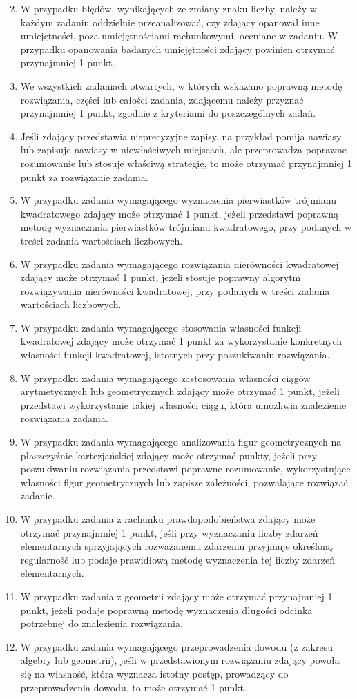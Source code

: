 \documentclass[10pt]{article}
\begin{document}
\begin{enumerate}
  \setcounter{enumi}{1}
  \item W przypadku błędów, wynikających ze zmiany znaku liczby, należy w każdym zadaniu oddzielnie przeanalizować, czy zdający opanował inne umiejętności, poza umiejętnościami rachunkowymi, oceniane w zadaniu. W przypadku opanowania badanych umiejętności zdający powinien otrzymać przynajmniej 1 punkt.
  \item We wszystkich zadaniach otwartych, w których wskazano poprawną metodę rozwiązania, części lub całości zadania, zdającemu należy przyznać przynajmniej 1 punkt, zgodnie z kryteriami do poszczególnych zadań.
  \item Jeśli zdający przedstawia nieprecyzyjne zapisy, na przykład pomija nawiasy lub zapisuje nawiasy w niewłaściwych miejscach, ale przeprowadza poprawne rozumowanie lub stosuje właściwą strategię, to może otrzymać przynajmniej 1 punkt za rozwiązanie zadania.
  \item W przypadku zadania wymagającego wyznaczenia pierwiastków trójmianu kwadratowego zdający może otrzymać 1 punkt, jeżeli przedstawi poprawną metodę wyznaczania pierwiastków trójmianu kwadratowego, przy podanych w treści zadania wartościach liczbowych.
  \item W przypadku zadania wymagającego rozwiązania nierówności kwadratowej zdający może otrzymać 1 punkt, jeżeli stosuje poprawny algorytm rozwiązywania nierówności kwadratowej, przy podanych w treści zadania wartościach liczbowych.
  \item W przypadku zadania wymagającego stosowania własności funkcji kwadratowej zdający może otrzymać 1 punkt za wykorzystanie konkretnych własności funkcji kwadratowej, istotnych przy poszukiwaniu rozwiązania.
  \item W przypadku zadania wymagającego zastosowania własności ciągów arytmetycznych lub geometrycznych zdający może otrzymać 1 punkt, jeżeli przedstawi wykorzystanie takiej własności ciągu, która umożliwia znalezienie rozwiązania zadania.
  \item W przypadku zadania wymagającego analizowania figur geometrycznych na płaszczyźnie kartezjańskiej zdający może otrzymać punkty, jeżeli przy poszukiwaniu rozwiązania przedstawi poprawne rozumowanie, wykorzystujące własności figur geometrycznych lub zapisze zależności, pozwalające rozwiązać zadanie.
  \item W przypadku zadania z rachunku prawdopodobieństwa zdający może otrzymać przynajmniej 1 punkt, jeśli przy wyznaczaniu liczby zdarzeń elementarnych sprzyjających rozważanemu zdarzeniu przyjmuje określoną regularność lub podaje prawidłową metodę wyznaczenia tej liczby zdarzeń elementarnych.
  \item W przypadku zadania z geometrii zdający może otrzymać przynajmniej 1 punkt, jeżeli podaje poprawną metodę wyznaczenia długości odcinka potrzebnej do znalezienia rozwiązania.
  \item W przypadku zadania wymagającego przeprowadzenia dowodu (z zakresu algebry lub geometrii), jeśli w przedstawionym rozwiązaniu zdający powoła się na własność, która wyznacza istotny postęp, prowadzący do przeprowadzenia dowodu, to może otrzymać 1 punkt.
\end{enumerate}
\end{document}
